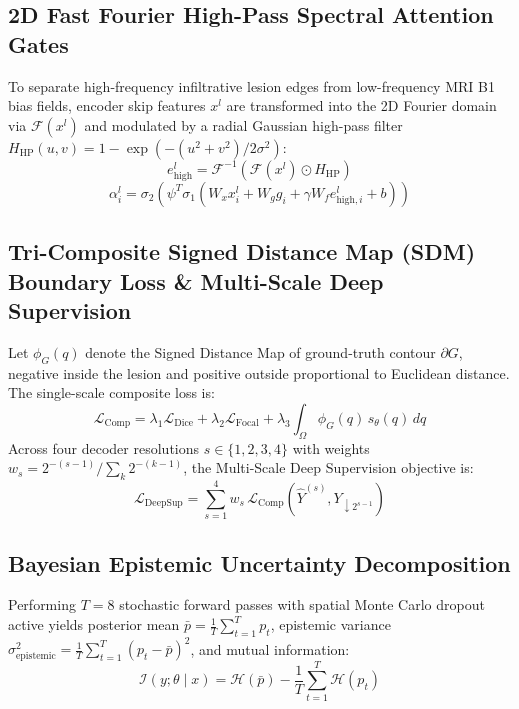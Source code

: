 \documentclass[conference]{IEEEtran}
\begin{document}
\subsection{2D Fast Fourier High-Pass Spectral Attention Gates}
To separate high-frequency infiltrative lesion edges from low-frequency MRI B1 bias fields, encoder skip features $x^l$ are transformed into the 2D Fourier domain via $\mathcal{F}(x^l)$ and modulated by a radial Gaussian high-pass filter $H_{\text{HP}}(u,v) = 1 - \exp(-(u^2+v^2)/2\sigma^2)$:
\begin{equation}
e_{\text{high}}^l = \mathcal{F}^{-1}\!\left(\mathcal{F}(x^l) \odot H_{\text{HP}}\right)
\end{equation}
\begin{equation}
\alpha_i^l = \sigma_2\!\left(\psi^T \sigma_1\!\left(W_x x_i^l + W_g g_i + \gamma W_f e_{\text{high},i}^l + b\right)\right)
\end{equation}

\subsection{Tri-Composite Signed Distance Map (SDM) Boundary Loss \& Multi-Scale Deep Supervision}
Let $\phi_G(q)$ denote the Signed Distance Map of ground-truth contour $\partial G$, negative inside the lesion and positive outside proportional to Euclidean distance. The single-scale composite loss is:
\begin{equation}
\mathcal{L}_{\text{Comp}} = \lambda_1 \mathcal{L}_{\text{Dice}} + \lambda_2 \mathcal{L}_{\text{Focal}} + \lambda_3 \int_{\Omega} \phi_G(q)\, s_\theta(q)\, dq
\end{equation}
Across four decoder resolutions $s \in \{1, 2, 3, 4\}$ with weights $w_s = 2^{-(s-1)} / \sum_k 2^{-(k-1)}$, the Multi-Scale Deep Supervision objective is:
\begin{equation}
\mathcal{L}_{\text{DeepSup}} = \sum_{s=1}^{4} w_s \, \mathcal{L}_{\text{Comp}}\!\left(\hat{Y}^{(s)}, Y_{\downarrow 2^{s-1}}\right)
\end{equation}

\subsection{Bayesian Epistemic Uncertainty Decomposition}
Performing $T=8$ stochastic forward passes with spatial Monte Carlo dropout active yields posterior mean $\bar{p} = \frac{1}{T}\sum_{t=1}^T p_t$, epistemic variance $\sigma^2_{\text{epistemic}} = \frac{1}{T}\sum_{t=1}^T (p_t - \bar{p})^2$, and mutual information:
\begin{equation}
\mathcal{I}(y; \theta \mid x) = \mathcal{H}(\bar{p}) - \frac{1}{T}\sum_{t=1}^{T} \mathcal{H}(p_t)
\end{equation}
\end{document}
